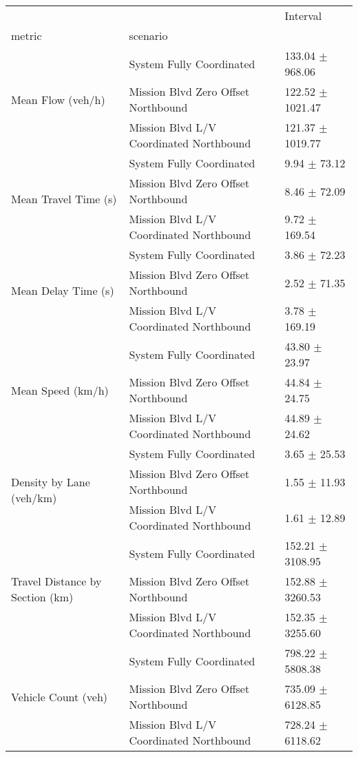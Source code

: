 \begin{tabular}{lll}
\toprule
 &  & Interval \\
metric & scenario &  \\
\midrule
\multirow[t]{3}{*}{Mean Flow (veh/h)} & System Fully Coordinated & 133.04 $\pm$ 968.06 \\
 & Mission Blvd Zero Offset Northbound & 122.52 $\pm$ 1021.47 \\
 & Mission Blvd L/V Coordinated Northbound & 121.37 $\pm$ 1019.77 \\
\multirow[t]{3}{*}{Mean Travel Time (s)} & System Fully Coordinated & 9.94 $\pm$ 73.12 \\
 & Mission Blvd Zero Offset Northbound & 8.46 $\pm$ 72.09 \\
 & Mission Blvd L/V Coordinated Northbound & 9.72 $\pm$ 169.54 \\
\multirow[t]{3}{*}{Mean Delay Time (s)} & System Fully Coordinated & 3.86 $\pm$ 72.23 \\
 & Mission Blvd Zero Offset Northbound & 2.52 $\pm$ 71.35 \\
 & Mission Blvd L/V Coordinated Northbound & 3.78 $\pm$ 169.19 \\
\multirow[t]{3}{*}{Mean Speed (km/h)} & System Fully Coordinated & 43.80 $\pm$ 23.97 \\
 & Mission Blvd Zero Offset Northbound & 44.84 $\pm$ 24.75 \\
 & Mission Blvd L/V Coordinated Northbound & 44.89 $\pm$ 24.62 \\
\multirow[t]{3}{*}{Density by Lane (veh/km)} & System Fully Coordinated & 3.65 $\pm$ 25.53 \\
 & Mission Blvd Zero Offset Northbound & 1.55 $\pm$ 11.93 \\
 & Mission Blvd L/V Coordinated Northbound & 1.61 $\pm$ 12.89 \\
\multirow[t]{3}{*}{Travel Distance by Section (km)} & System Fully Coordinated & 152.21 $\pm$ 3108.95 \\
 & Mission Blvd Zero Offset Northbound & 152.88 $\pm$ 3260.53 \\
 & Mission Blvd L/V Coordinated Northbound & 152.35 $\pm$ 3255.60 \\
\multirow[t]{3}{*}{Vehicle Count (veh)} & System Fully Coordinated & 798.22 $\pm$ 5808.38 \\
 & Mission Blvd Zero Offset Northbound & 735.09 $\pm$ 6128.85 \\
 & Mission Blvd L/V Coordinated Northbound & 728.24 $\pm$ 6118.62 \\
\bottomrule
\end{tabular}
